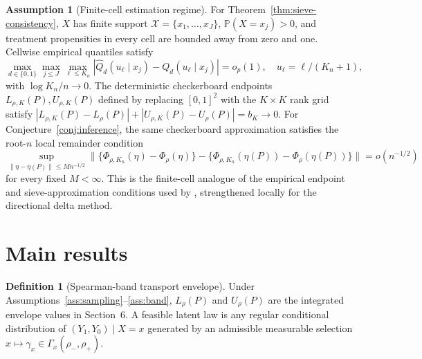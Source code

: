 \documentclass[11pt]{article}
\renewcommand{\Pr}{\mathbb{P}}
\theoremstyle{definition}
\newtheorem{definition}{Definition}
\newtheorem{assumption}{Assumption}
\theoremstyle{plain}
\theoremstyle{remark}
\begin{document}
\begin{assumption}[Finite-cell estimation regime]\label{ass:finite-cell}
For Theorem~\ref{thm:sieve-consistency}, \(X\) has finite support \(\mathcal X=\{x_1,\ldots,x_J\}\), \(\Pr(X=x_j)>0\), and treatment propensities in every cell are bounded away from zero and one.  Cellwise empirical quantiles satisfy
\[
\max_{d\in\{0,1\}}\max_{j\le J}\max_{\ell\le K_n}
\left|\widehat Q_d(u_\ell\mid x_j)-Q_d(u_\ell\mid x_j)\right|=o_p(1),
\quad u_\ell=\ell/(K_n+1),
\]
with \(\log K_n/n\to0\).  The deterministic checkerboard endpoints \(L_{\rho,K}(P),U_{\rho,K}(P)\) defined by replacing \([0,1]^2\) with the \(K\times K\) rank grid satisfy \(|L_{\rho,K}(P)-L_\rho(P)|+|U_{\rho,K}(P)-U_\rho(P)|=b_K\to0\).  For Conjecture~\ref{conj:inference}, the same checkerboard approximation satisfies the root-\(n\) local remainder condition
\[
\sup_{\|\eta-\eta(P)\|\le M n^{-1/2}}
\|\{\Phi_{\rho,K_n}(\eta)-\Phi_\rho(\eta)\}
-\{\Phi_{\rho,K_n}(\eta(P))-\Phi_\rho(\eta(P))\}\|=o(n^{-1/2})
\]
for every fixed \(M<\infty\).  This is the finite-cell analogue of the empirical endpoint and sieve-approximation conditions used by \citet{FanPark2010DTEBounds}, strengthened locally for the directional delta method.
\end{assumption}

\section{Main results}
\begin{definition}[Spearman-band transport envelope]\label{def:endpoints}
Under Assumptions~\ref{ass:sampling}--\ref{ass:band}, \(L_\rho(P)\) and \(U_\rho(P)\) are the integrated envelope values in Section~6.  A feasible latent law is any regular conditional distribution of \((Y_1,Y_0)\mid X=x\) generated by an admissible measurable selection \(x\mapsto \gamma_x\in\Gamma_x(\rho_-,\rho_+)\).
\end{definition}
\end{document}
